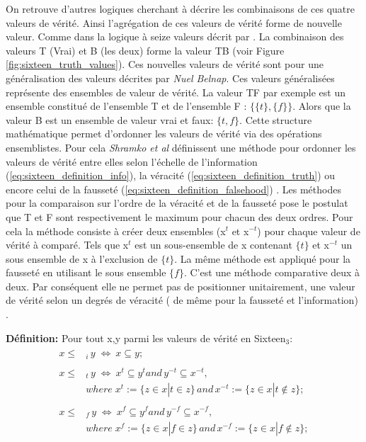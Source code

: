 \begin{refsegment}
    On retrouve d'autres logiques cherchant à décrire les combinaisons de ces quatre valeurs de vérité. Ainsi l'agrégation de ces valeurs de vérité forme de nouvelle valeur. Comme dans la logique à seize valeurs décrit par \citeauthor{shramko2005some} \cite{shramko2005some,shramko2011truth,shramko2006hyper}. La combinaison des valeurs T (Vrai) et B (les deux) forme la valeur TB (voir Figure \ref{fig:sixteen_truth_values}). Ces nouvelles valeurs de vérité sont pour \citeauthor{shramko2005some} une généralisation des valeurs décrites par \textit{Nuel Belnap}. Ces valeurs généralisées représente des ensembles de valeur de vérité. La valeur TF par exemple est un ensemble constitué de l'ensemble T et de l'ensemble F : $\{\{t\},\{f\}\}$. Alors que la valeur B est un ensemble de valeur vrai et faux: $\{t,f\}$. Cette structure mathématique permet d'ordonner les valeurs de vérité via des opérations ensemblistes. Pour cela \textit{Shramko et al} définissent une méthode pour ordonner les valeurs de vérité entre elles selon l'échelle de l'information (\ref{eq:sixteen_definition_info}), la véracité (\ref{eq:sixteen_definition_truth}) ou encore celui de la fausseté (\ref{eq:sixteen_definition_falsehood}) . Les méthodes pour la comparaison sur l'ordre de la véracité et de la fausseté pose le postulat que T et F sont respectivement le maximum pour chacun des deux ordres. Pour cela la méthode consiste à créer deux ensembles (x$^{t}$ et x$^{-t}$) pour chaque valeur de vérité à comparé. Tels que x$^{t}$ est un sous-ensemble de x contenant $\{t\}$ et x$^{-t}$ un sous ensemble de x à l'exclusion de $\{t\}$. La même méthode est appliqué pour la fausseté en utilisant le sous ensemble $\{f\}$.  C'est une méthode comparative deux à deux. Par conséquent elle ne permet pas de positionner unitairement, une valeur de vérité selon un degrés de véracité ( de même pour la fausseté et l'information) .
    
    \textbf{Définition:} Pour tout x,y parmi les valeurs de vérité en Sixteen$_{3}$:\nolisttopbreak \vspace{-0.5cm}
    \begin{align}
        \begin{split}
        x \leq& _{i} \, y \; \iff \: x \subseteq y\label{eq:sixteen_definition_info};
        \end{split}\\ \begin{split}\label{eq:sixteen_definition_truth}
        x \leq& _{t} \, y \; \iff \: x^{t} \subseteq y^{t} and \, y^{-t} \subseteq x^{-t},\\
              &where \; x^{t} := \{z \in x | t \in z \} \, and \, x^{-t} := \{z \in x | t \notin z \};
        \end{split}\\ \begin{split}\label{eq:sixteen_definition_falsehood}
        x \leq& _{f} \, y \; \iff \: x^{f} \subseteq y^{f} and \, y^{-f} \subseteq x^{-f},\\
              &where \; x^{f} := \{z \in x | f \in z \} \, and \, x^{-f} := \{z \in x | f \notin z \};
        \end{split}
    \end{align}
    

\end{refsegment}
